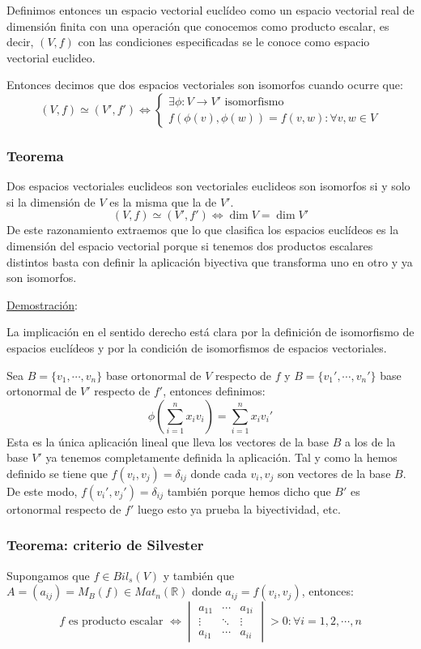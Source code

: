 \documentclass[10pt,a4paper,openright]{book}
\theoremstyle{break}
\begin{document}
Definimos entonces un espacio vectorial euclídeo como un espacio vectorial real de dimensión finita con una operación que conocemos como producto escalar, es decir, $(V,f)$ con las condiciones especificadas se le conoce como espacio vectorial euclideo.

Entonces decimos que dos espacios vectoriales son isomorfos cuando ocurre que:
$$(V,f) \simeq (V',f')\Leftrightarrow \begin{cases} \exists \phi: V\rightarrow V' \mbox{ isomorfismo} \\ f(\phi(v),\phi(w)) = f(v,w): \forall v,w\in V\end{cases}$$

\subsubsection*{Teorema}
Dos espacios vectoriales euclideos son vectoriales euclideos son isomorfos si y solo si la dimensión de $V$ es la misma que la de $V'$.
$$(V,f) \simeq (V',f')\Leftrightarrow \dim V = \dim V'$$
De este razonamiento extraemos que lo que clasifica los espacios euclídeos es la dimensión del espacio vectorial porque si tenemos dos productos escalares distintos basta con definir la aplicación biyectiva que transforma uno en otro y ya son isomorfos.

\underline{Demostración}:

La implicación en el sentido derecho está clara por la definición de isomorfismo de espacios euclídeos y por la condición de isomorfismos de espacios vectoriales.

Sea $B=\{v_1, \cdots , v_n\}$ base ortonormal de $V$ respecto de $f$ y $B=\{v_1', \cdots, v_n'\}$ base ortonormal de $V'$ respecto de $f'$, entonces definimos:
$$\phi\left(\sum_{i=1}^{n}x_iv_i\right)=\sum_{i=1}^{n}x_iv_i'$$
Esta es la única aplicación lineal que lleva los vectores de la base $B$ a los de la base $V'$ ya tenemos completamente definida la aplicación. Tal y como la hemos definido se tiene que $f(v_i,v_j) = \delta_{ij}$ donde cada $v_i, v_j$ son vectores de la base $B$. De este modo, $f(v_i',v_j') = \delta_{ij}$ también porque hemos dicho que $B'$ es ortonormal respecto de $f'$ luego esto ya prueba la biyectividad, etc.

\subsubsection*{Teorema: criterio de Silvester}
Supongamos que $f\in Bil_s(V)$ y también que $A=(a_{ij})=M_B(f)\in Mat_n(\mathbb R)$ donde $a_{ij} = f(v_i,v_j)$, entonces:
$$f\mbox{ es producto escalar }\Leftrightarrow\begin{vmatrix} a_{11} & \cdots & a_{1i} \\ \vdots & \ddots & \vdots \\ a_{i1} & \cdots & a_{ii}\end{vmatrix} > 0 : \forall i =1, 2, \cdots , n$$
\end{document}
